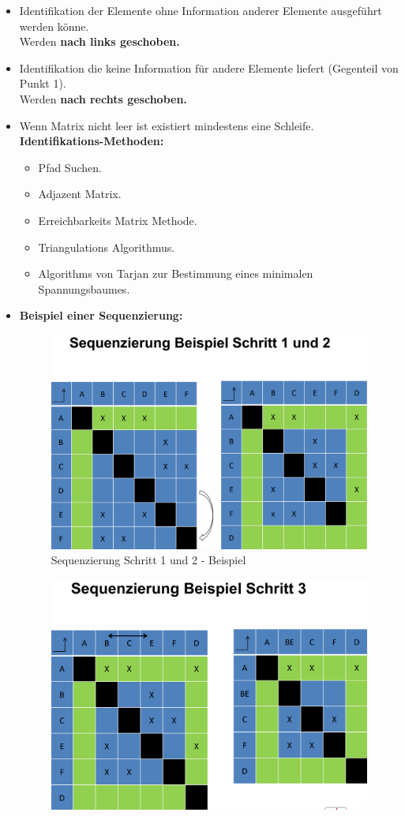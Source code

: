 \begin{itemize}
    \item Identifikation der Elemente ohne Information anderer Elemente ausgeführt werden könne.
        \\ Werden \textbf{nach links geschoben.}
    \item Identifikation die keine Information für andere Elemente liefert (Gegenteil von Punkt 1).
        \\ Werden \textbf{nach rechts geschoben.}
    \item Wenn Matrix nicht leer ist existiert mindestens eine Schleife. 
        \\ \textbf{Identifikations-Methoden:}
        \begin{itemize}
            \item Pfad Suchen.
            \item Adjazent Matrix.
            \item Erreichbarkeits Matrix Methode.
            \item Triangulations Algorithmus.
            \item Algorithms von Tarjan zur Bestimmung eines minimalen Spannungsbaumes.
        \end{itemize}
    \item \textbf{Beispiel einer Sequenzierung:}
        \begin{figure}[H]
            \centering
            \includegraphics[width=0.8\linewidth]{Bilder/Teil3_SequenzierungBeispiel1.png}
            \caption{Sequenzierung Schritt 1 und 2 - Beispiel}
        \end{figure}
        \begin{figure}[H]
            \centering
            \includegraphics[width=0.8\linewidth]{Bilder/Teil3_SequenzierungBeispiel2.png}

\end{figure}
\end{itemize}
